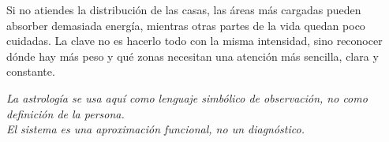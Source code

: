 \documentclass[11pt,a4paper]{article}
\begin{document}
\vspace{0.6cm}
Si no atiendes la distribución de las casas, las áreas más cargadas pueden absorber demasiada energía, mientras otras partes de la vida quedan poco cuidadas. La clave no es hacerlo todo con la misma intensidad, sino reconocer dónde hay más peso y qué zonas necesitan una atención más sencilla, clara y constante.

\vspace{0.5cm}
\begin{center}
{\small\itshape\color{grisai}
La astrología se usa aquí como lenguaje simbólico de observación, no como definición de la persona.\\
El sistema es una aproximación funcional, no un diagnóstico.
}
\end{center}
\end{document}
